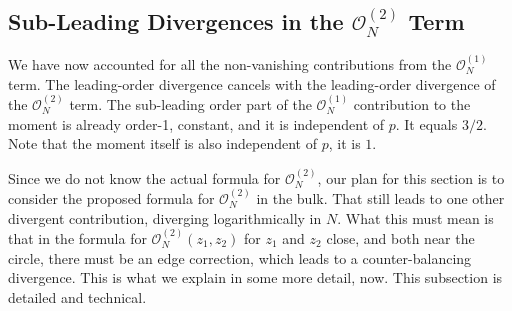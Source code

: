 \documentclass[12pt]{report}
\theoremstyle{definition}
\begin{document}
\subsection{Sub-Leading Divergences in the $\mathcal{O}_N^{(2)}$ Term}

We have now accounted for all the non-vanishing contributions from the $\mathcal{O}_N^{(1)}$ term.
The leading-order divergence cancels with the leading-order divergence of the $\mathcal{O}_N^{(2)}$ term.
The sub-leading order part of the $\mathcal{O}_N^{(1)}$ contribution to the moment is already order-1, constant, and it is independent of $p$.
It equals $3/2$.
Note that the moment itself is also independent of $p$, it is $1$.

Since we do not know the actual formula for $\mathcal{O}_N^{(2)}$, our plan for this section is to consider the proposed formula
for $\mathcal{O}_N^{(2)}$ in the bulk.
That still leads to one other divergent contribution, diverging logarithmically in $N$.
What this must mean is that in the formula for $\mathcal{O}_N^{(2)}(z_1,z_2)$ for $z_1$ and $z_2$
close, and both near the circle, there must be an edge correction,
which leads to a counter-balancing divergence.
This is what we explain in some more detail, now.
This subsection is detailed and technical.
\end{document}
